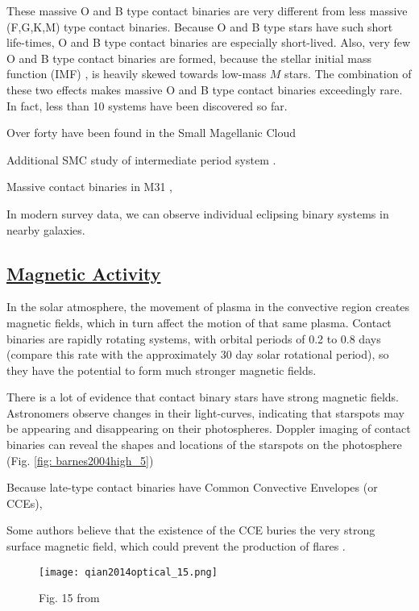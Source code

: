 \documentclass[12pt]{article} %
\numberwithin{equation}{section} %
\begin{document}
These massive O and B type contact binaries are very different from less massive (F,G,K,M) type contact binaries. Because O and B type stars have such short life-times, O and B type contact binaries are especially short-lived. Also, very few O and B type contact binaries are formed, because the stellar initial mass function (IMF) , is heavily skewed towards low-mass $M$ stars. The combination of these two effects makes massive O and B type contact binaries exceedingly rare. In fact, less than 10 systems have been discovered so far.

Over forty have been found in the Small Magellanic Cloud \citep{hilditch2005forty} 

Additional SMC study of intermediate period system \citep{priya2013photometric}.

Massive contact binaries in M31 \citep{lee2014properties}, \citep{vilardell2006eclipsing}

In modern survey data, we can observe individual eclipsing binary systems in nearby galaxies.


\subsection[Magnetic Activity]{\hyperlink{toc}{Magnetic Activity}}

In the solar atmosphere, the movement of plasma in the convective region creates magnetic fields, which in turn affect the motion of that same plasma. Contact binaries are rapidly rotating systems, with orbital periods of 0.2 to 0.8 days (compare this rate with the approximately 30 day solar rotational period), so they have the potential to form much stronger magnetic fields.

There is a lot of evidence that contact binary stars have strong magnetic fields. Astronomers observe changes in their light-curves, indicating that starspots may be appearing and disappearing on their photospheres. Doppler imaging of contact binaries can reveal the shapes and locations of the starspots on the photosphere (Fig. \ref{fig: barnes2004high_5})

 Because late-type contact binaries have Common Convective Envelopes (or CCEs), 

Some authors believe that the existence of the CCE buries the very strong surface magnetic field, which could prevent the production of flares \citep{qian2014optical}. 

\begin{figure}[H]
\centering
\texttt{[image: qian2014optical\_15.png]}
\caption{Fig. 15 from \citet{qian2014optical}}
\label{fig: qian2014optical_15}
\end{figure}
\end{document}
